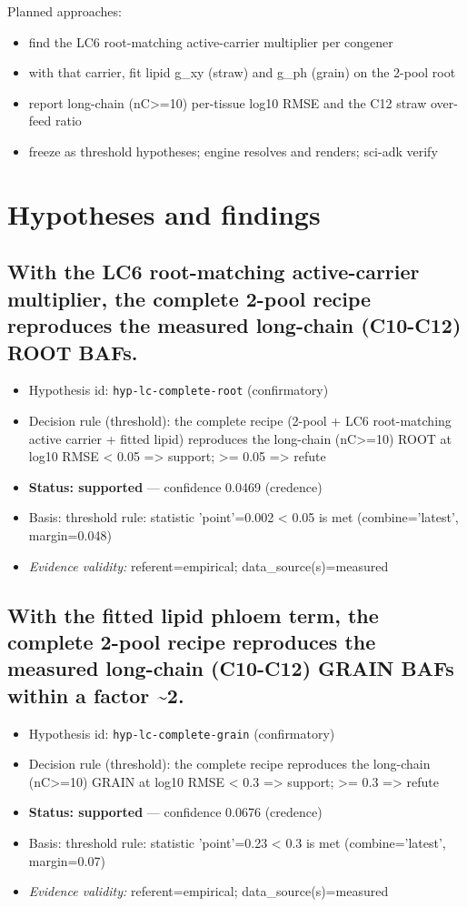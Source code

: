 \documentclass{article}
\begin{document}
Planned approaches:
\begin{itemize}
  \item find the LC6 root-matching active-carrier multiplier per congener
  \item with that carrier, fit lipid g\_xy (straw) and g\_ph (grain) on the 2-pool root
  \item report long-chain (nC>=10) per-tissue log10 RMSE and the C12 straw over-feed ratio
  \item freeze as threshold hypotheses; engine resolves and renders; sci-adk verify
\end{itemize}

\section{Hypotheses and findings}

\subsection{With the LC6 root-matching active-carrier multiplier, the complete 2-pool recipe reproduces the measured long-chain (C10-C12) ROOT BAFs.}
\begin{itemize}
  \item Hypothesis id: \texttt{hyp-lc-complete-root} (confirmatory)
  \item Decision rule (threshold): the complete recipe (2-pool + LC6 root-matching active carrier + fitted lipid) reproduces the long-chain (nC>=10) ROOT at log10 RMSE < 0.05 => support; >= 0.05 => refute
  \item \textbf{Status: supported} --- confidence 0.0469 (credence)
  \item Basis: threshold rule: statistic 'point'=0.002 < 0.05 is met (combine='latest', margin=0.048)
  \item \textit{Evidence validity:} referent=empirical; data\_source(s)=measured
\end{itemize}

\subsection{With the fitted lipid phloem term, the complete 2-pool recipe reproduces the measured long-chain (C10-C12) GRAIN BAFs within a factor \textasciitilde{}2.}
\begin{itemize}
  \item Hypothesis id: \texttt{hyp-lc-complete-grain} (confirmatory)
  \item Decision rule (threshold): the complete recipe reproduces the long-chain (nC>=10) GRAIN at log10 RMSE < 0.3 => support; >= 0.3 => refute
  \item \textbf{Status: supported} --- confidence 0.0676 (credence)
  \item Basis: threshold rule: statistic 'point'=0.23 < 0.3 is met (combine='latest', margin=0.07)
  \item \textit{Evidence validity:} referent=empirical; data\_source(s)=measured
\end{itemize}
\end{document}
